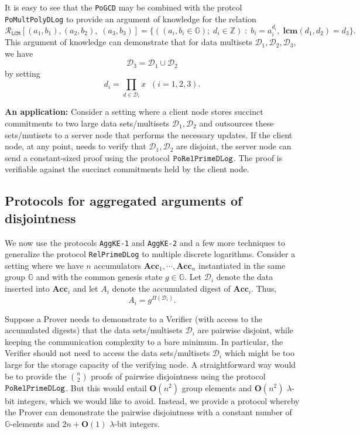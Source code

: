 \documentclass[11pt, lettersize, notitlepage, leqno, footskip=0.6cm]{article}
\newcommand{\bz}{\mathbb Z}
\newcommand{\ttt}{\texttt}
\newcommand{\Acc}{\mbf{Acc}}
\newcommand{\mc}{\mathcal}
\newcommand{\mb}{\mathbb}
\newcommand{\mbf}{\mathbf}
\newcommand{\lam}{\lambda}
\newcommand{\bO}{\mbf{O}}
\newcommand{\vs}{\vspace{-0.15cm}}
\newcommand{\noin}{\noindent}
\newcommand{\LCM}{\mbf{lcm}}
\numberwithin{equation}{section}
\begin{document}
It is easy to see that the \verb|PoGCD| may be combined with the protcol \verb|PoMultPolyDLog| to provide an argument of knowledge for the relation \vs $$\mc{R}_{{\ttt{LCM}}}[(a_1,b_1),(a_2,b_2), \; (a_3, b_3)] = \{((a_i, b_i\in\mb{G});\;d_i\in\bz)\;:\; b_i = a_i^{d_i},\;\LCM(d_1,d_2)=d_3 \} .$$ This argument of knowledge can demonstrate that for data multisets $\mc{D}_1,\mc{D}_2, \mc{D}_3$, we have \vs $$\mc{D}_3 = \mc{D}_1\cup \mc{D}_2 $$ by setting \vs $$ d_i = \prod\limits_{d\in\mc{D}_i} x\;\;(i=1,2,3).$$

\noin \textbf{An application:} Consider a setting where a client node stores succinct commitments to two large data sets/multisets $\mc{D}_1, \mc{D}_2$ and outsources these sets/mutisets to a server node that performs the necessary updates. If the client node, at any point, needs to verify that $\mc{D}_1, \mc{D}_2$ are disjoint, the server node can send a constant-sized proof using the protocol $\tt{PoRelPrimeDLog}$. The proof is verifiable against the succinct commitments held by the client node.






\subsection{\fontsize{11}{11}\selectfont Protocols for aggregated arguments of disjointness}

We now use the protocols \verb|AggKE-1| and \verb|AggKE-2| and a few more techniques to generalize the protocol \verb|RelPrimeDLog| to multiple discrete logarithms. Consider a setting where we have $n$ accumulators $\Acc_1,\cdots,\Acc_n$ instantiated in the same group $\mb{G}$ and with the common genesis state $g\in\mb{G}$. Let $\mc{D}_i$ denote the data inserted into $\Acc_i$ and let $A_i$ denote the accumulated digest of $\Acc_i$. Thus, \vs $$A_i = g^{\Pi(\mc{D}_i)} .$$ 

Suppose a Prover needs to demonstrate to a Verifier (with access to the accumulated digests) that the data sets/multisets $\mc{D}_i$ are pairwise disjoint, while keeping the communication complexity to a bare minimum. In particular, the Verifier should not need to access the data sets/multisets $\mc{D}_i$ which might be too large for the storage capacity of the verifying node. A straightforward way would be to provide the $n\choose 2$ proofs of pairwise disjointness using the protocol $\tt{PoRelPrimeDLog}$. But this would entail $\mbf{O}(n^2)$ group elements and $\mbf{O}(n^2)$ $\lam$-bit integers, which we would like to avoid. Instead, we provide a protocol whereby the Prover can demonstrate the pairwise disjointness with a constant number of $\mb{G}$-elements and $2n+\bO(1)$ $\lam$-bit integers.
\end{document}

